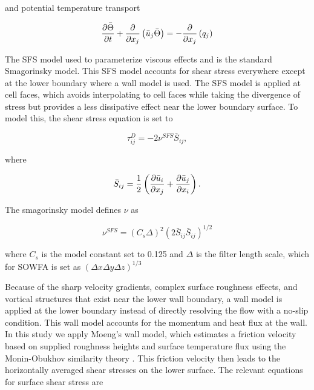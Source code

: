 and potential temperature transport

\begin{equation}
   \label{potential temp}
   \frac{\partial \bar{\Theta}}{\partial t} + \frac{\partial}{\partial x_j}\left(\bar{u}_j \bar{\Theta} \right)
   = - \frac{\partial}{\partial x_j}\left( q_j\right) 
\end{equation}

The SFS model used to parameterize viscous effects and is the standard Smagorinsky model.  This SFS model accounts for shear stress everywhere except at the lower boundary where a wall model is used.  The SFS model is applied at cell faces, which avoids interpolating to cell faces while taking the divergence of stress but provides a less dissipative effect near the lower boundary surface.  To model this, the shear stress equation is set to

\begin{equation}
   \label{eq:smagorinsky}
   \tau^D_{ij} = -2 \nu^{SFS} \bar{S}_{ij},
\end{equation}

where

\begin{equation}
   \bar{S}_{ij} = \frac{1}{2} \left( \frac{\partial \bar{u}_i}{\partial x_j} + \frac{\partial \bar{u}_j}{\partial x_i} \right).
\end{equation}

The smagorinsky model defines $\nu$ as

\begin{equation}
   \nu^{SFS} = (C_s \Delta)^2(2\bar{S}_{ij}\bar{S}_{ij})^{1/2}
\end{equation}

where $C_s$ is the model constant set to 0.125 and $\Delta$ is the filter length scale, which for SOWFA is set as $(\Delta x \Delta y \Delta z)^{1/3}$

Because of the sharp velocity gradients, complex surface roughness effects, and vortical structures that exist near the lower wall boundary, a wall model is applied at the lower boundary instead of directly resolving the flow with a no-slip condition.  This wall model accounts for the momentum and heat flux at the wall.  In this study we apply Moeng's wall model, which estimates a friction velocity based on supplied roughness heights and surface temperature flux using the Monin-Obukhov similarity theory \cite{moeng_large-eddy-simulation_1984}.  This friction velocity then leads to the horizontally averaged shear stresses on the lower surface.  The relevant equations for surface shear stress are 

